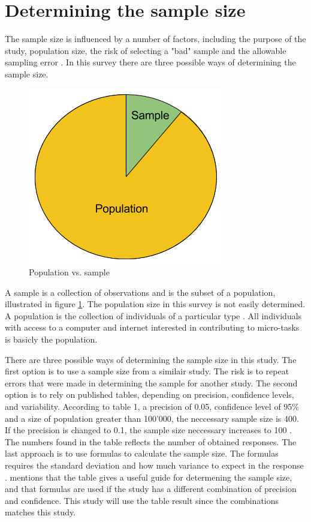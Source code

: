 \section[Sample Size]{Determining the sample size}
The sample size is influenced by a number of factors, including the purpose of the study, population size, the risk of selecting a "bad" sample and the allowable sampling error \citep{Israel1992}. In this survey there are three possible ways of determining the sample size. 

\begin{figure}[h]
	\centering
	\includegraphics[width=0.35\linewidth]{fig/popsample}
	\caption{Population vs. sample}
	\label{fig:popsample}
\end{figure}

A sample is a collection of observations and is the subset of a population, illustrated in figure \ref{fig:popsample}. The population size in this survey is not easily determined. A population is the collection of individuals of a particular type \citep{Walpole2012}. All individuals with access to a computer and internet interested in contributing to micro-tasks is basicly the population. 

There are three possible ways of determining the sample size in this study. The first option is to use a sample size from a similair study. The risk is to repeat errors that were made in determining the sample for another study. The second option is to rely on published tables, depending on precision, confidence levels, and variability. According to \cite{Israel1992} table 1, a precision of 0.05, confidence level of 95\% and a size of population greater than 100'000, the neccessary sample size is 400. If the precision is changed to 0.1, the sample size neccessary increases to 100 \citep{Israel1992}. The numbers found in the table reflects the number of obtained responses. The last approach is to use formulas to calculate the sample size. The formulas requires the standard deviation and how much variance to expect in the response \citep{Smith2013}\citep{Israel1992}. \cite{Israel1992} mentions that the table gives a useful guide for determening the sample size, and that formulas are used if the study has a different combination of precision and confidence. This study will use the table result since the combinations matches this study.

